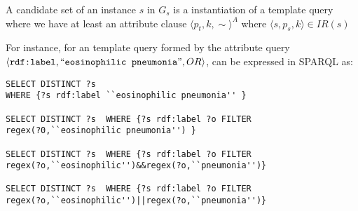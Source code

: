 \begin{definition}   A candidate set of an instance $s$ in $G_s$ is a instantiation of a template query where we have at least an attribute clause $\langle p_t,k,\sim \rangle^A$ where $\langle s,p_s,k \rangle \in IR(s)$
\end{definition} 

For instance, for an template query formed by the attribute query $\langle\verb+rdf:label+,``\verb+eosinophilic+$  $\verb+pneumonia+",OR\rangle$, can be expressed in SPARQL as: 

\begin{footnotesize} 
\begin{verbatim}
SELECT DISTINCT ?s  
WHERE {?s rdf:label ``eosinophilic pneumonia'' } 
 
SELECT DISTINCT ?s  WHERE {?s rdf:label ?o FILTER
regex(?0,``eosinophilic pneumonia'') } 

SELECT DISTINCT ?s  WHERE {?s rdf:label ?o FILTER 
regex(?o,``eosinophilic'')&&regex(?o,``pneumonia'')} 

SELECT DISTINCT ?s  WHERE {?s rdf:label ?o FILTER
regex(?o,``eosinophilic'')||regex(?o,``pneumonia'')} 
\end{verbatim}
\end{footnotesize}

